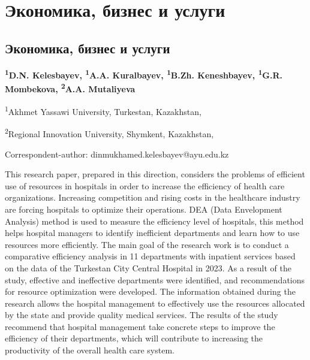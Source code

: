 \newpage
\let\cleardoublepage\clearpage
\part{Экономика, бизнес и услуги}
\let\cleardoublepage\clearpage
\chapter{Экономика, бизнес и услуги}

\begin{articleheader}

{\bfseries
\textsuperscript{1}D.N. Kelesbayev\textsuperscript{\envelope },
\textsuperscript{1}A.A. Kuralbayev,
\textsuperscript{1}B.Zh. Keneshbayev,
\textsuperscript{1}G.R. Mombekova,
\textsuperscript{2}A.A. Mutaliyeva
}
\end{articleheader}

\begin{affiliation}
\textsuperscript{1}Akhmet Yassawi University, Turkestan, Kazakhstan,

\textsuperscript{2}Regional Innovation University, Shymkent, Kazakhstan,

\raggedright \textsuperscript{\envelope }Correspondent-author: dinmukhamed.kelesbayev@ayu.edu.kz
\end{affiliation}

This research paper, prepared in this direction, considers the problems
of efficient use of resources in hospitals in order to increase the
efficiency of health care organizations. Increasing competition and
rising costs in the healthcare industry are forcing hospitals to
optimize their operations. DEA (Data Envelopment Analysis) method is
used to measure the efficiency level of hospitals, this method helps
hospital managers to identify inefficient departments and learn how to
use resources more efficiently. The main goal of the research work is to
conduct a comparative efficiency analysis in 11 departments with
inpatient services based on the data of the Turkestan City Central
Hospital in 2023. As a result of the study, effective and ineffective
departments were identified, and recommendations for resource
optimization were developed. The information obtained during the
research allows the hospital management to effectively use the resour\-ces
allocated by the state and provide quality medical services. The results
of the study recommend that hospital management take concrete steps to
improve the efficiency of their departments, which will contrib\-ute to
increasing the productivity of the overall health care system.

